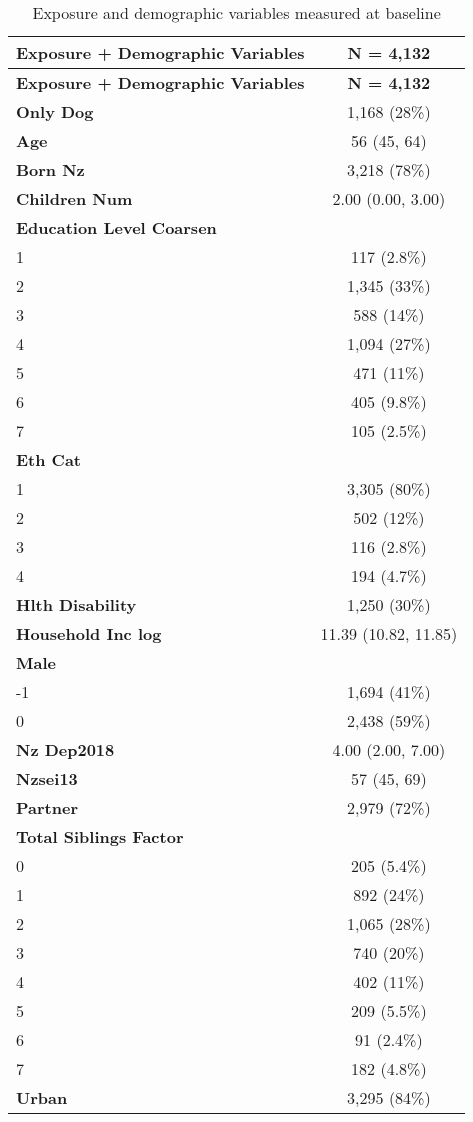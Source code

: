 \documentclass[
  singlecolumn,
  9pt]{article}
\begin{document}
\hypertarget{tbl-table_demographic_vars_dogs}{}
\begin{longtable}[]{@{}lc@{}}
\caption{\label{tbl-table_demographic_vars_dogs}Exposure and demographic
variables measured at baseline}\tabularnewline
\toprule\noalign{}
\textbf{Exposure + Demographic Variables} & \textbf{N = 4,132} \\
\midrule\noalign{}
\endfirsthead
\toprule\noalign{}
\textbf{Exposure + Demographic Variables} & \textbf{N = 4,132} \\
\midrule\noalign{}
\endhead
\bottomrule\noalign{}
\endlastfoot
\textbf{Only Dog} & 1,168 (28\%) \\
\textbf{Age} & 56 (45, 64) \\
\textbf{Born Nz} & 3,218 (78\%) \\
\textbf{Children Num} & 2.00 (0.00, 3.00) \\
\textbf{Education Level Coarsen} & \\
1 & 117 (2.8\%) \\
2 & 1,345 (33\%) \\
3 & 588 (14\%) \\
4 & 1,094 (27\%) \\
5 & 471 (11\%) \\
6 & 405 (9.8\%) \\
7 & 105 (2.5\%) \\
\textbf{Eth Cat} & \\
1 & 3,305 (80\%) \\
2 & 502 (12\%) \\
3 & 116 (2.8\%) \\
4 & 194 (4.7\%) \\
\textbf{Hlth Disability} & 1,250 (30\%) \\
\textbf{Household Inc log} & 11.39 (10.82, 11.85) \\
\textbf{Male} & \\
-1 & 1,694 (41\%) \\
0 & 2,438 (59\%) \\
\textbf{Nz Dep2018} & 4.00 (2.00, 7.00) \\
\textbf{Nzsei13} & 57 (45, 69) \\
\textbf{Partner} & 2,979 (72\%) \\
\textbf{Total Siblings Factor} & \\
0 & 205 (5.4\%) \\
1 & 892 (24\%) \\
2 & 1,065 (28\%) \\
3 & 740 (20\%) \\
4 & 402 (11\%) \\
5 & 209 (5.5\%) \\
6 & 91 (2.4\%) \\
7 & 182 (4.8\%) \\
\textbf{Urban} & 3,295 (84\%) \\
\end{longtable}
\end{document}
